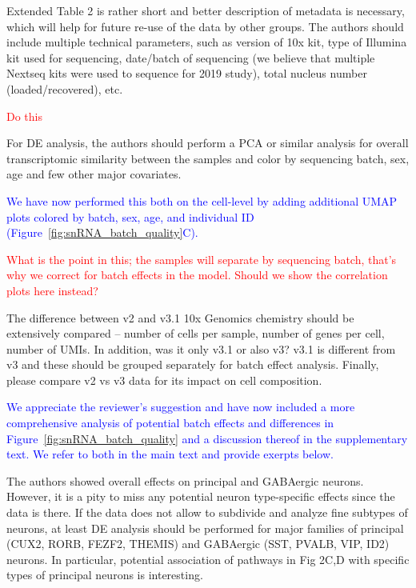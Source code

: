 \begin{quote}
	\quoteE
\end{quote}

Extended Table 2 is rather short and better description of metadata is necessary, which will help for future re-use of the data by other groups. The authors should include multiple technical parameters, such as version of 10x kit, type of Illumina kit used for sequencing, date/batch of sequencing (we believe that multiple Nextseq kits were used to sequence for 2019 study), total nucleus number (loaded/recovered), etc.

\textcolor{red}{Do this}

For DE analysis, the authors should perform a PCA or similar analysis for overall transcriptomic similarity between the samples and color by sequencing batch, sex, age and few other major covariates.

\textcolor{blue}{We have now performed this both on the cell-level by adding additional UMAP plots colored by batch, sex, age, and individual ID (Figure~\ref{fig:snRNA_batch_quality}C).}

\textcolor{red}{What is the point in this; the samples will separate by sequencing batch, that's why we correct for batch effects in the model. Should we show the correlation plots here instead?}

The difference between v2 and v3.1 10x Genomics chemistry should be extensively compared – number of cells per sample, number of genes per cell, number of UMIs. In addition, was it only v3.1 or also v3? v3.1 is different from v3 and these should be grouped separately for batch effect analysis. Finally, please compare v2 vs v3 data for its impact on cell composition.

\textcolor{blue}{We appreciate the reviewer's suggestion and have now included a more comprehensive analysis of potential batch effects and differences in Figure~\ref{fig:snRNA_batch_quality} and a discussion thereof in the supplementary text. We refer to both in the main text and provide exerpts below.}

The authors showed overall effects on principal and GABAergic neurons. However, it is a pity to miss any potential neuron type-specific effects since the data is there. If the data does not allow to subdivide and analyze fine subtypes of neurons, at least DE analysis should be performed for major families of principal (CUX2, RORB, FEZF2, THEMIS) and GABAergic (SST, PVALB, VIP, ID2) neurons. In particular, potential association of pathways in Fig 2C,D with specific types of principal neurons is interesting.

